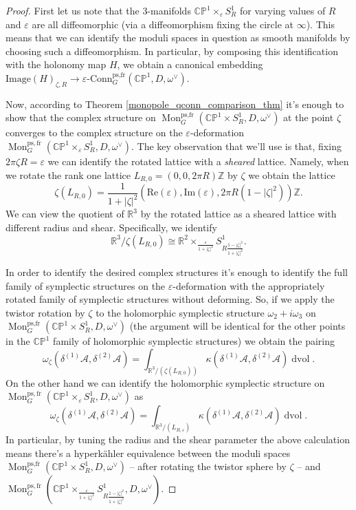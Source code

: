 \documentclass[11pt, oneside, reqno]{amsart}
\theoremstyle{definition} \newtheorem{definition}{Definition}[section]
\theoremstyle{definition} \newtheorem{remark}[definition]{Remark}
\theoremstyle{definition} \newtheorem{remarks}[definition]{Remarks}
\theoremstyle{definition} \newtheorem{question}[definition]{Question}
\theoremstyle{definition} \newtheorem*{note}{Note}
\theoremstyle{definition} \newtheorem{example}[definition]{Example}
\theoremstyle{definition} \newtheorem{examples}[definition]{Examples}
\newcommand{\bb}[1]{\mathbb{#1}}
\newcommand{\mr}[1]{\mathrm{#1}}
\newcommand{\mc}[1]{\mathcal{#1}}
\newcommand{\RR}{\mathbb{R}}
\newcommand{\ZZ}{\mathbb{Z}}
\newcommand{\eps}{\varepsilon}
\newcommand{\iso}{\cong}
\DeclareMathOperator{\dvol}{dvol}
\DeclareMathOperator{\mon}{Mon}
\newcommand{\epsconn}{\varepsilon\text{-Conn}}
\newcommand{\fr}{\mathrm{fr}}
\begin{document}
\begin{proof}
First let us note that the 3-manifolds $\bb{CP}^1 \times_\eps S^1_R$ for varying values of $R$ and $\eps$ are all diffeomorphic (via a diffeomorphism fixing the circle at $\infty$).  This means that we can identify the moduli spaces in question as smooth manifolds by choosing such a diffeomorphism.  In particular, by composing this identification with the holonomy map $H$, we obtain a canonical embedding $\mr{Image}(H)_{\zeta,R} \to \epsconn^{\text{ps,fr}}_G(\bb{CP}^1,D,\omega^\vee)$.  

Now, according to Theorem \ref{monopole_qconn_comparison_thm} it's enough to show that the complex structure on $\mon_G^{\text{ps,fr}}(\bb{CP}^1 \times S^1_R,D,\omega^\vee)$ at the point $\zeta$ converges to the complex structure on the $\eps$-deformation $\mon_G^{\mr{ps},\fr}(\bb{CP}^1 \times_\eps S^1_R,D,\omega^\vee)$.  The key observation that we'll use is that, fixing $2 \pi \zeta R = \eps$ we can identify the rotated lattice with a \emph{sheared} lattice.  Namely, when we rotate the rank one lattice $L_{R,0} = (0,0,2\pi R)\ZZ$ by $\zeta$ we obtain the lattice
\[\zeta(L_{R,0}) = \frac {1}{1+|\zeta|^2} (\mr{Re}(\eps), \mr{Im}(\eps), 2\pi R (1-|\zeta|^2) )\ZZ.\]
We can view the quotient of $\RR^3$ by the rotated lattice as a sheared lattice with different radius and shear.  Specifically, we identify
\[\RR^3 / \zeta(L_{R,0}) \iso \RR^2 \times_{\frac{\eps}{1+|\zeta|^2}} S^1_{R \frac {1-|\zeta|^2}{1+|\zeta|^2}}.\]

In order to identify the desired complex structures it's enough to identify the full family of symplectic structures on the $\eps$-deformation with the appropriately rotated family of symplectic structures without deforming.  So, if we apply the twistor rotation by $\zeta$ to the holomorphic symplectic structure $\omega_2 + i\omega_3$ on $\mon_G^{\text{ps,fr}}(\bb{CP}^1 \times S^1_R,D,\omega^\vee)$ (the argument will be identical for the other points in the $\bb{CP}^1$ family of holomorphic symplectic structures) we obtain the pairing
\[\omega_\zeta(\delta^{(1)}\mc A, \delta^{(2)}\mc A) = \int_{\RR^3/(\zeta(L_{R,0}))} \kappa(\delta^{(1)} \mc A, \delta^{(2)} \mc A) \dvol.\]
On the other hand we can identify the holomorphic symplectic structure on $\mon_G^{\mr{ps},\fr}(\bb{CP}^1 \times_\eps S^1_R,D,\omega^\vee)$ as
\[\omega_\zeta(\delta^{(1)}\mc A, \delta^{(2)}\mc A) = \int_{\RR^3/(L_{R,\eps})} \kappa(\delta^{(1)} \mc A, \delta^{(2)} \mc A) \dvol.\]
In particular, by tuning the radius and the shear parameter the above calculation means there's a hyperk\"ahler equivalence between the moduli spaces $\mon_G^{\text{ps,fr}}(\bb{CP}^1 \times S^1_R,D,\omega^\vee)$ -- after rotating the twistor sphere by $\zeta$ -- and $\mon_G^{\mr{ps},\fr}(\bb{CP}^1 \times_{\frac{\eps}{1+|\zeta|^2}} S^1_{R \frac {1-|\zeta|^2}{1+|\zeta|^2}},D,\omega^\vee)$.  


\end{proof}
\end{document}

